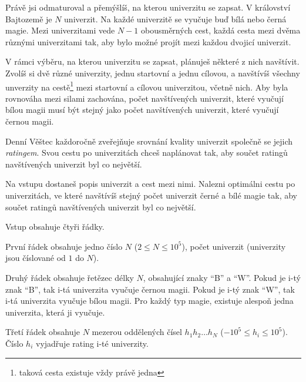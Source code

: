 





Právě jsi odmaturoval a přemýšlíš, na kterou univerzitu se zapsat.
V království Bajtozemě je $N$ univerzit.
Na každé univerzitě se vyučuje buď bílá nebo černá magie.
Mezi univerzitami vede $N-1$ obousměrných cest, každá cesta mezi dvěma různými univerzitami tak,
aby bylo možné projít mezi každou dvojicí univerzit.

V rámci výběru, na kterou univerzitu se zapsat, plánuješ některé z nich navštívit.
Zvolíš si dvě různé univerzity, jednu startovní a jednu cílovou, a navštívíš
všechny unverzity na cestě\footnote{taková cesta existuje vždy právě jedna} mezi
startovní a cílovou univerzitou, včetně nich.
Aby byla rovnováha mezi silami zachována, počet navštívených univerzit, které
vyučují bílou magii musí být stejný jako počet navštívených univerzit, které
vyučují černou magii.

Denní Věštec každoročně zveřejňuje srovnání kvality univerzit společně se jejich \textit{ratingem}. Svou cestu po univerzitách chceš
naplánovat tak, aby součet ratingů navštívených univerzit byl co největší.


Na vstupu dostaneš popis univerzit a cest mezi nimi.
Nalezni optimálni cestu po univerzitách, ve které navštívíš stejný počet
univerzit černé a bílé magie tak, aby součet ratingů navštívených univerzit
byl co největší.


Vstup obsahuje čtyři řádky.

První řádek obsahuje jedno číslo $N$ ($2 \leq N \leq 10^5$), počet univerzit (univerzity jsou číslované od $1$ do $N$).

Druhý řádek obsahuje řetězec délky $N$, obsahující znaky ``B'' a ``W''.
Pokud je i-tý znak ``B'', tak i-tá univerzita vyučuje černou magii.
Pokud je i-tý znak ``W'', tak i-tá univerzita vyučuje bílou magii.
Pro každý typ magie, existuje alespoň jedna univerzita, která ji vyučuje.

Třetí řádek obsahuje $N$ mezerou oddělených čísel $h_1 h_2 \ldots h_N$ ($-10^5 \leq h_i \leq 10^5$).
Číslo $h_i$ vyjadřuje rating i-té univerzity.

